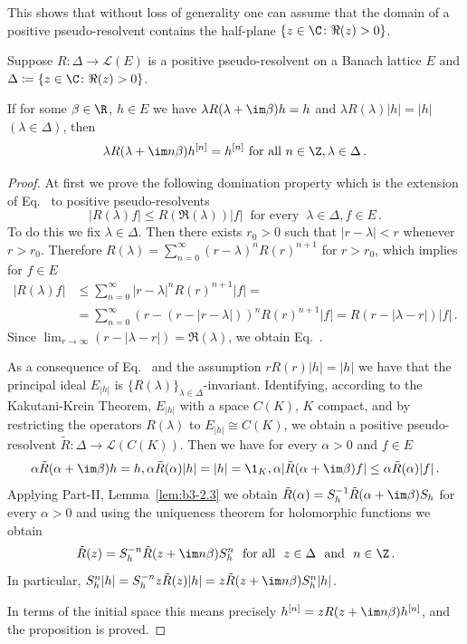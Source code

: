 This shows that without loss of generality one can assume that the domain of a positive pseudo-resolvent contains the half-plane $\{z \in \C  \colon \Re(z) > 0\}$.
\begin{proposition}\label{prop:c3-2.7}
	Suppose $R \colon \Delta \to \mathcal{L}(E)$ is a positive pseudo-resolvent on a Banach lattice $E$ and $\Delta \coloneqq \{z \in \C  \colon \Re(z) > 0\}$.
	
	If for some $\beta \in \R $, $h \in E$ we have
	$\lambda R(\lambda+\im\beta)h = h$ and $\lambda R(\lambda)|h| = |h|$ $(\lambda \in \Delta)$, then
	\[
    \lambda R(\lambda+\im n\beta)h^{[n]} = h^{[n]} \text{ for all } n \in \Z, \lambda \in \Delta\,.
    \]
\end{proposition}
\begin{proof}
At first we prove the following domination property which is the extension of Eq.~ to positive pseudo-resolvents
\begin{equation}\label{eq:c3-2.13}
	|R(\lambda)f| \leq R(\Re(\lambda)) |f| \ \text{ for every } \ \lambda \in \Delta , f \in E\,.
\end{equation}
To do this we fix $\lambda \in \Delta$.
Then there exists $r_{0} > 0$ such that $|r-\lambda| < r$ whenever $r > r_{0}$.
Therefore $R(\lambda) = \sum_{n=0}^{\infty}(r-\lambda)^{n}R(r)^{n+1}$ for $r > r_{0}$, which implies for $f \in E$
\begin{align*}
	|R(\lambda)f| &\leq \sum_{n=0}^{\infty}|r-\lambda|^{n}R(r)^{n+1}|f| = \\
	& =\sum_{n=0}^{\infty}(r - (r-|r-\lambda|))^{n}R(r)^{n+1}|f| = R(r - |\lambda-r|) |f|\,.
\end{align*}
Since $\lim_{r \to \infty} (r - |\lambda-r|) = \Re(\lambda)$, we obtain Eq.~.

As a consequence of Eq.~ and the assumption $rR(r) |h| = |h|$ we have that the principal ideal $E_{|h|}$ is $\{R(\lambda)\}_{\lambda \in \Delta}$-invariant.
Identifying, according to the Kakutani-Krein Theorem, $E_{|h|}$ with a space $C(K)$, $K$ compact, and by restricting the operators $R(\lambda)$ to $E_{|h|} \cong C(K)$, we obtain a positive pseudo-resolvent $\tilde{R} \colon \Delta \to \mathcal{L}(C(K))$.
Then we have for every $\alpha > 0$ and $f \in E$
\[
\alpha\tilde{R}(\alpha+\im\beta)h = h, \alpha\tilde{R}(\alpha) |h| = |h| = \1_{K}, \alpha|\tilde{R}(\alpha+\im\beta)f| \leq \alpha\tilde{R}(\alpha) |f|\,.
\]
Applying Part-II, Lemma~\ref{lem:b3-2.3} we obtain $\tilde{R}(\alpha) = S_{h}^{-1}\tilde{R}(\alpha + \im\beta)S_{h}$ for every $\alpha > 0$ and using the uniqueness theorem for holomorphic functions we obtain
\begin{equation}\label{eq:c3-2.14}
\tilde{R}(z) = S_{h}^{-n}\tilde{R}(z + \im n\beta)S_{h}^{n} \ \text{ for all } \ z \in \Delta \ \text{ and } \ n \in \Z\,.
\end{equation}
In particular, $S_{h}^{n}|h| = S_{h}^{-n}z\tilde{R}(z) |h| = z\tilde{R}(z+\im n\beta)S_{h}^{n}|h|$.

In terms of the initial space this means precisely $h^{[n]} = zR(z+\im n\beta)h^{[n]}$, and the proposition is proved.
\end{proof}
